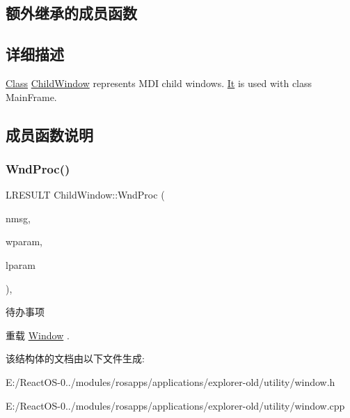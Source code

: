 \subsection*{额外继承的成员函数}


\subsection{详细描述}
\hyperlink{class_class}{Class} \hyperlink{struct_child_window}{Child\+Window} represents M\+DI child windows. \hyperlink{class_it}{It} is used with class Main\+Frame. 

\subsection{成员函数说明}
\mbox{\label{struct_child_window_ab3516027124ec7f703d95b54bfdd83c4}} 
\subsubsection{\texorpdfstring{Wnd\+Proc()}{WndProc()}}
{\footnotesize\ttfamily L\+R\+E\+S\+U\+LT Child\+Window\+::\+Wnd\+Proc (\begin{DoxyParamCaption}\item[{U\+I\+NT}]{nmsg,  }\item[{W\+P\+A\+R\+AM}]{wparam,  }\item[{L\+P\+A\+R\+AM}]{lparam }\end{DoxyParamCaption})\hspace{0.3cm}{\ttfamily [protected]}, {\ttfamily [virtual]}}

\begin{DoxyRefDesc}{待办事项}
\item[\hyperlink{todo__todo000084}{待办事项}]\end{DoxyRefDesc}


重载 \hyperlink{struct_window}{Window} .



该结构体的文档由以下文件生成\+:\begin{DoxyCompactItemize}
\item 
E\+:/\+React\+O\+S-\/0../modules/rosapps/applications/explorer-\/old/utility/window.\+h\item 
E\+:/\+React\+O\+S-\/0../modules/rosapps/applications/explorer-\/old/utility/window.\+cpp\end{DoxyCompactItemize}
